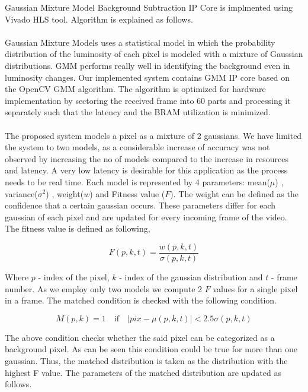 \documentclass[12pt,a4paper]{report}
\begin{document}
Gaussian Mixture Model Background Subtraction IP Core is implmented using Vivado HLS tool. Algorithm is explained as follows.\\\\
Gaussian Mixture Models uses a statistical model in which the probability distribution of the luminosity of each pixel is modeled with a mixture of Gaussian distributions. GMM performs really well in identifying the background even in luminosity changes. Our implemented system contains GMM IP core based on the OpenCV GMM algorithm.  The algorithm is optimized for hardware implementation by sectoring the received frame into 60 parts and processing it separately such that the latency and the BRAM utilization is minimized.\\\\
The proposed system models a pixel as a mixture of 2 gaussians. We have limited the system to two models, as a considerable increase of accuracy was not observed by increasing the no of models compared to the increase in resources and latency. A very low latency is desirable for this application as the process needs to be real time. Each model is represented by 4 parameters: mean($\mu$) , variance($\sigma^2$) , weight($w$) and Fitness value ($F$). The weight can be defined as the confidence that a certain gaussian occurs. These parameters differ for each gaussian of each pixel and are updated for every incoming frame of the video.\\
The fitness value is defined as following,

\begin{equation}
F(p,k,t)=\frac{w(p,k,t)}{\sigma(p,k,t)}
\end{equation}

Where $p$ - index of the pixel, $k$ - index of the gaussian distribution and $t$ - frame number. As we employ only two models we compute 2 $F$ values for a single pixel in a frame. The matched condition is checked with the following condition. 

\begin{equation}
M(p,k)=1 \quad \textrm{if}  \quad |pix- \mu(p,k,t)| < 2.5\sigma(p,k,t)
\end{equation}

The above condition checks whether the said pixel can be categorized as a background pixel. As can be seen this condition could be true for more than one gaussian. Thus, the matched distribution is taken as the distribution with the highest F value. The parameters of the matched distribution are updated as follows. 
\end{document}
